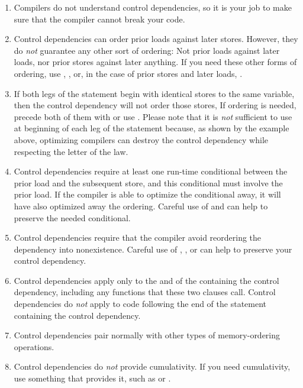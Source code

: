 \begin{enumerate}
\item	Compilers do not understand control dependencies, so it is
	your job to make sure that the compiler cannot break your code.

\item	Control dependencies can order prior loads against later stores.
	However, they do \emph{not} guarantee any other sort of ordering:
	Not prior loads against later loads, nor prior stores against
	later anything.
	If you need these other forms of ordering, use ,
	, or, in the case of prior stores and later loads,
	.

\item	If both legs of the  statement begin with identical stores
	to the same variable, then the control dependency will not order
	those stores,
	If ordering is needed, precede both of them with  or
	use .
	Please note that it is \emph{not} sufficient to use 
	at beginning of each leg of the  statement because, as shown
	by the example above, optimizing compilers can destroy the control
	dependency while respecting the letter of the  law.

\item	Control dependencies require at least one run-time conditional
	between the prior load and the subsequent store, and this
	conditional must involve the prior load.
	If the compiler is able to optimize the conditional away, it
	will have also optimized away the ordering.
	Careful use of  and  can help
	to preserve the needed conditional.

\item	Control dependencies require that the compiler avoid reordering
	the dependency into nonexistence.
	Careful use of , , or
	 can help to preserve your control
	dependency.

\item	Control dependencies apply only to the  and
	 of the  containing the control
	dependency, including any functions that these two clauses call.
	Control dependencies do \emph{not} apply to code following the
	end of the  statement containing the control dependency.

\item	Control dependencies pair normally with other types of
	memory-ordering operations.

\item	Control dependencies do \emph{not} provide cumulativity.
	If you need cumulativity, use something that provides it,
	such as  or .
\end{enumerate}

